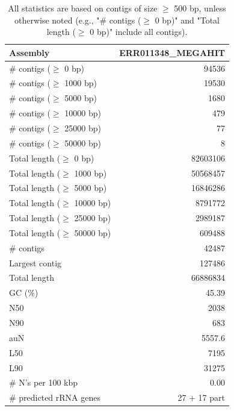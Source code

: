 \documentclass[12pt,a4paper]{article}
\begin{document}
\begin{table}[ht]
\begin{center}
\caption{All statistics are based on contigs of size $\geq$ 500 bp, unless otherwise noted (e.g., "\# contigs ($\geq$ 0 bp)" and "Total length ($\geq$ 0 bp)" include all contigs).}
\begin{tabular}{|l*{1}{|r}|}
\hline
Assembly & ERR011348\_MEGAHIT \\ \hline
\# contigs ($\geq$ 0 bp) & 94536 \\ \hline
\# contigs ($\geq$ 1000 bp) & 19530 \\ \hline
\# contigs ($\geq$ 5000 bp) & 1680 \\ \hline
\# contigs ($\geq$ 10000 bp) & 479 \\ \hline
\# contigs ($\geq$ 25000 bp) & 77 \\ \hline
\# contigs ($\geq$ 50000 bp) & 8 \\ \hline
Total length ($\geq$ 0 bp) & 82603106 \\ \hline
Total length ($\geq$ 1000 bp) & 50568457 \\ \hline
Total length ($\geq$ 5000 bp) & 16846286 \\ \hline
Total length ($\geq$ 10000 bp) & 8791772 \\ \hline
Total length ($\geq$ 25000 bp) & 2989187 \\ \hline
Total length ($\geq$ 50000 bp) & 609488 \\ \hline
\# contigs & 42487 \\ \hline
Largest contig & 127486 \\ \hline
Total length & 66886834 \\ \hline
GC (\%) & 45.39 \\ \hline
N50 & 2038 \\ \hline
N90 & 683 \\ \hline
auN & 5557.6 \\ \hline
L50 & 7195 \\ \hline
L90 & 31275 \\ \hline
\# N's per 100 kbp & 0.00 \\ \hline
\# predicted rRNA genes & 27 + 17 part \\ \hline
\end{tabular}
\end{center}
\end{table}
\end{document}
